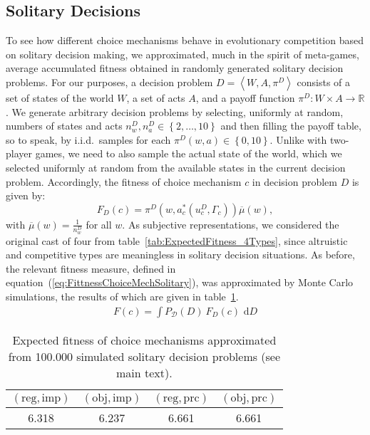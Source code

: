\documentclass[fleqn,reqno,12pt]{article}
\theoremstyle{Satz}
\theoremstyle{Bsp}
\newcommand{\set}[1]{\left\{#1\right\}}
\newcommand{\tuple}[1]{\left \langle #1\right\rangle}
\newcommand{\Acts}{\ensuremath{A}\xspace}		%
\newcommand{\act}{\ensuremath{a}\xspace}		%
\begin{document}
\subsection{Solitary Decisions}
\label{sec:solitary-decisions}

To see how different choice mechanisms behave in evolutionary competition based on solitary
decision making, we approximated, much in the spirit of meta-games, average accumulated
fitness obtained in randomly generated solitary decision problems. For our purposes, a decision
problem $D=\tuple{W, \Acts, \pi^D}$ consists of a set of states of the world $W$, a set of acts $\Acts$, and
a payoff function $\pi^D: W \times \Acts \rightarrow \mathbb{R}$.  We generate arbitrary
decision problems by selecting, uniformly at random, numbers of states and acts
$n^{D}_w, n^{D}_\act \in \set{2, \dots, 10}$ and then filling the payoff table, so to speak, by
i.i.d.~samples for each $\pi^D(w, \act) \in \set{0, 10}$. Unlike with
two-player games, we need to also sample the actual state of the world, which we selected
uniformly at random from the available states in the current decision problem. Accordingly, the fitness of choice mechanism $c$ in decision problem $D$ is given by:
$$F_D(c)= \pi^D(w,a_c^*(u_c^D,\Gamma_c))\overline{\mu}(w),$$ with $ \overline{\mu}(w)= \frac{1}{n_w^D}$ for all $w$.
As subjective representations,
we considered the original cast of four from table~\ref{tab:ExpectedFitness_4Types}, since altruistic and
competitive types are meaningless in solitary decision situations. As before, the
relevant fitness measure, defined in equation~(\ref{eq:FittnessChoiceMechSolitary}), was
approximated by Monte Carlo simulations, the results of which are given in
table~\ref{tab:SolitaryDecisions}.
\begin{align}
  \label{eq:FittnessChoiceMechSolitary}
  F(c) = \int P_{\mathcal{D}}(D) \  F_D(c) \text{ d} D 
\end{align}
\begin{table}
  \centering
  \begin{tabular}{cccc}
    \toprule
   $(\text{reg}, \text{imp})$ 
 & $(\text{obj}, \text{imp})$ 
 & $(\text{reg}, \text{prc})$ 
 & $(\text{obj}, \text{prc})$ 
 \\ \midrule
    6.318 & 6.237 & 6.661 & 6.661 \\ \bottomrule
  \end{tabular}
  \caption{Expected fitness of choice mechanisms approximated from 100.000 simulated solitary
    decision problems (see main text).}
  \label{tab:SolitaryDecisions}
\end{table}
\end{document}
